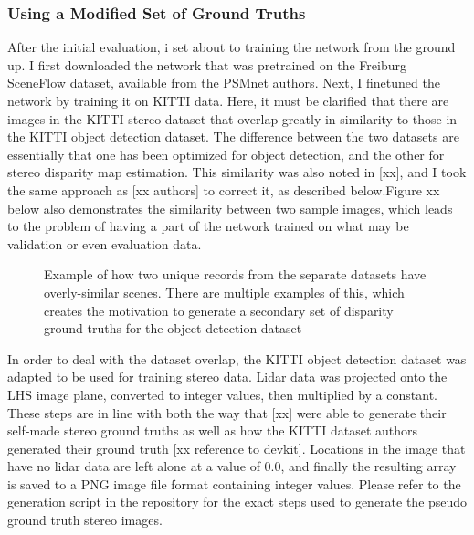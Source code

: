\subsubsection{Using a Modified Set of Ground Truths}
After the initial evaluation, i set about to training the network from the ground up. I first downloaded the network that was pretrained on the Freiburg SceneFlow dataset, available from the PSMnet authors. Next, I finetuned the network by training it on KITTI data. Here, it must be clarified that there are images in the KITTI stereo dataset that overlap greatly in similarity to those in the KITTI object detection dataset. The difference between the two datasets are essentially that one has been optimized for object detection, and the other for stereo disparity map estimation. This similarity was also noted in [xx], and I took the same approach as [xx authors] to correct it, as described below.Figure xx below also demonstrates the similarity between two sample images, which leads to the problem of having a part of the network trained on what may be validation or even evaluation data. 

\begin{figure}[H]
    \centering  
    \label{similarity_stereo_objdet}
    \caption{Example of how two unique records from the separate datasets have overly-similar scenes. There are multiple examples of this, which creates the motivation to generate a secondary set of disparity ground truths for the object detection dataset}
\end{figure}

In order to deal with the dataset overlap, the KITTI object detection dataset was adapted to be used for training stereo data. Lidar data was projected onto the LHS image plane, converted to integer values, then multiplied by a constant. These steps are in line with both the way that [xx] were able to generate their self-made stereo ground truths as well as how the KITTI dataset authors generated their ground truth [xx reference to devkit]. Locations in the image that have no lidar data are left alone at a value of 0.0, and finally the resulting array is saved to a PNG image file format containing integer values. Please refer to the generation script in the repository for the exact steps used to generate the pseudo ground truth stereo images.

